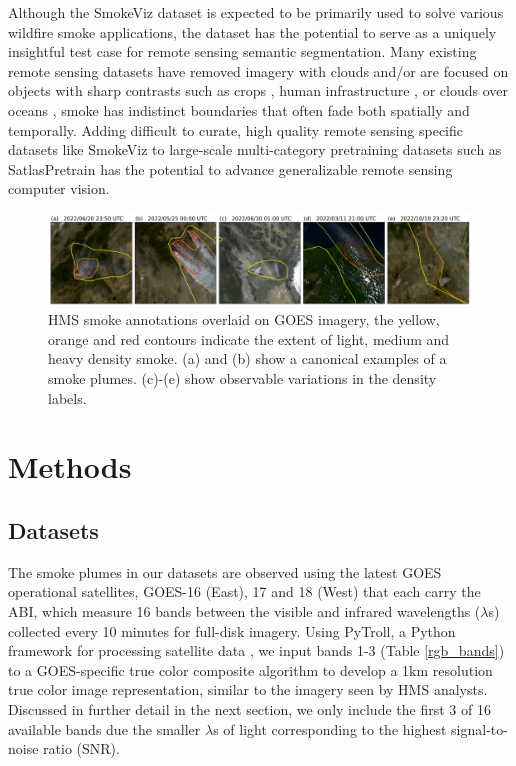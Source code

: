 \documentclass{article}
\begin{document}
Although the SmokeViz dataset is expected to be primarily used to solve various wildfire smoke applications, the dataset has the potential to serve as a uniquely insightful test case for remote sensing semantic segmentation. Many existing remote sensing datasets have removed imagery with clouds \cite{bigearthnet, crops} and/or are focused on objects with sharp contrasts such as crops \cite{crops}, human infrastructure \cite{polyworld}, or clouds over oceans \cite{cyclone, cloud_texture}, smoke has indistinct boundaries that often fade both spatially and temporally. Adding difficult to curate, high quality remote sensing specific datasets like SmokeViz to large-scale multi-category pretraining datasets such as SatlasPretrain \cite{satlas} has the potential to advance generalizable remote sensing computer vision.

\begin{figure}[!htb]
    \centering
    \includegraphics[width=\linewidth]{figures/variations_small.png}
    \caption{HMS smoke annotations overlaid on GOES imagery, the yellow, orange and red contours indicate the extent of light, medium and heavy density smoke. (a) and (b) show a canonical examples of a smoke plumes. (c)-(e) show observable variations in the density labels.}\label{densities}
\end{figure}

\section{Methods}
\subsection{Datasets}

The smoke plumes in our datasets are observed using the latest GOES operational satellites, GOES-16 (East), 17 and 18 (West) that each carry the ABI, which measure 16 bands between the visible and infrared wavelengths (\(\lambda\)s) collected every 10 minutes for full-disk imagery. Using PyTroll, a Python framework for processing satellite data \cite{satpy}, we input bands 1-3 (Table \ref{rgb_bands}) to a GOES-specific true color composite algorithm \cite{true_color} to develop a 1km resolution true color image representation, similar to the imagery seen by HMS analysts. Discussed in further detail in the next section, we only include the first 3 of 16 available bands due the smaller \(\lambda\)s of light corresponding to the highest signal-to-noise ratio (SNR).
\end{document}
